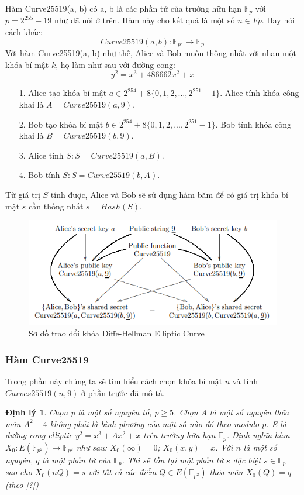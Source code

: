 \documentclass[a4paper,12pt]{report}
\newtheorem{theorem}{Định lý}[chapter]
\begin{document}
Hàm Curve25519(a, b) có a, b là các phần tử của trường hữu hạn $\mathbb{F}_p$ với $p = 2^{255} - 19$ như đã nói ở trên. Hàm này cho kết quả là một số $n \in Fp$. Hay nói cách khác:
\begin{displaymath}
Curve25519(a, b): \mathbb{F}_{p^2} \rightarrow \mathbb{F}_p
\end{displaymath}
Với hàm Curve25519(a, b) như thế, Alice và Bob muốn thống nhất với nhau một khóa bí mật $k$, họ làm như sau với đường cong:
\begin{displaymath}
y^2 = x^3 + 486662x^2 + x
\end{displaymath}
\begin{itemize}
\item[1. ] Alice tạo khóa bí mật $a \in 2^{254} + 8\{0, 1, 2, \ldots, 2^{251} - 1\}$. Alice tính khóa công khai là $A = Curve25519(a, 9)$.
\item[2. ] Bob tạo khóa bí mật $b \in 2^{254} + 8\{0, 1, 2, ..., 2^{251} - 1\}$. Bob tính khóa công khai là $B = Curve25519(b, 9)$.
\item[3. ] Alice tính $S: S = Curve25519(a, B)$.
\item[4. ] Bob tính $S: S = Curve25519(b, A)$.
\end{itemize}
Từ giá trị $S$ tính được, Alice và Bob sẽ sử dụng hàm băm để có giá trị khóa bí mật $s$ cần thống nhất $s = Hash(S)$.
\begin{center}
\begin{figure}[H]
\centering
\includegraphics[width=0.85\linewidth]{../im23.png}
\caption{Sơ đồ trao đổi khóa Diffe-Hellman Elliptic Curve}
\end{figure}
\end{center}
\subsubsection{Hàm Curve25519}
Trong phần này chúng ta sẽ tìm hiểu cách chọn khóa bí mật $n$ và tính $Curves25519(n, 9)$ ở phần trước đã mô tả.
\begin{theorem} \label{dl4.1}
Chọn p là một số nguyên tố, $p \geq 5$. Chọn A là một số nguyên thõa mãn $A^2 - 4$ không phải là bình phương của một số nào đó theo modulo $p$. E là đường cong elliptic $y^2 = x^3 + Ax^2 + x$ trên trường hữu hạn $\mathbb{F}_p$. Định nghĩa hàm $X_0 : E(\mathbb{F}_{p^2} ) \rightarrow  \mathbb{F}_{p^2}$ như sau: $X_0(\infty) = 0$; $X_0(x, y) = x$. Với $n$ là một số nguyên, $q$ là một phần tử của $\mathbb{F}_p$. Thì sẽ tồn tại một phần tử $s$ đặc biệt $s \in \mathbb{F}_p$ sao cho $X_0(nQ) = s$ với tất cả các điểm $Q \in E(\mathbb{F}_{p^2} )$ thõa mãn $X_0(Q) = q$ (theo [?])
\end{theorem}
\end{document}
